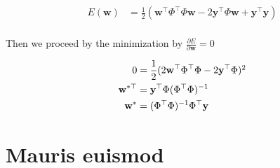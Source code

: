 \begin{appendices}
\begin{align*}
  E(\mathbf{w}) &= \frac{1}{2}(\mathbf{w}^\top \Phi^\top \Phi \mathbf{w}  - 2\mathbf{y}^\top \Phi \mathbf{w} + \mathbf{y}^\top \mathbf{y}) \nonumber \\
\end{align*}

Then we proceed by the minimization by $\frac{\partial E}{\partial \mathbf{w}} = 0$

\begin{align}
  0 &= \frac{1}{2}(2\mathbf{w}^\top \Phi^\top \Phi - 2\mathbf{y}^\top \Phi) \footnotemark[2] \nonumber \\
  \mathbf{w}^{*\top} &= \mathbf{y}^\top \Phi (\Phi^\top \Phi) ^{-1} \nonumber \\
  \mathbf{w}^{*} &= (\Phi^\top \Phi)^{-1}\Phi^\top \mathbf{y} 
\end{align}

  \section{Mauris euismod}
\end{appendices}